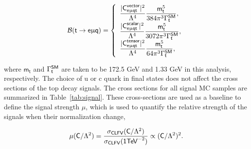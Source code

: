 \begin{equation}
\label{eq:4}
\mathcal{B}(\textsf{t}\rightarrow\textsf{e}\upmu\textsf{q}) = 
\left\{ 
 \begin{array}{l}
 \displaystyle
 \frac{|\textsf{C}^{\textsf{vector}}_{\textsf{e}\upmu\textsf{{q}t}}|^2}{\mathrm{\Lambda}^4}\frac{\textsf{m}_\textsf{t}^5}{384\pi^3\mathrm{\Gamma}_{\textsf{t}}^{\textsf{SM}}},\\
 \displaystyle
 \frac{|\textsf{C}^{\textsf{scalar}}_{\textsf{e}\upmu\textsf{{q}t}}|^2}{\mathrm{\Lambda}^4}\frac{\textsf{m}_\textsf{t}^5}{3072\pi^3\mathrm{\Gamma}_{\textsf{t}}^{\textsf{SM}}}, \\
 \displaystyle
 \frac{|\textsf{C}^{\textsf{tensor}}_{\textsf{e}\upmu\textsf{{q}t}}|^2}{\mathrm{\Lambda}^4}\frac{\textsf{m}_\textsf{t}^5}{64\pi^3\mathrm{\Gamma}_{\textsf{t}}^{\textsf{SM}}}, 
\end{array}
\right.
\end{equation}

where $\textsf{m}_{\textsf{t}}$ and $\mathrm{\Gamma}_{\textsf{t}}^{\textsf{SM}}$ are taken to be 172.5 GeV and 1.33 GeV in this analysis, respectively. The choice of u or c quark in final states does not affect the cross sections of the top decay signals. The cross sections for all signal \ac{MC} samples are summarized in Table~\ref{tab:signal}. These cross-sections are used as a baseline to define the signal strength $\mu$, which is used to quantify the relative strength of the signals when their normalization change,

\begin{equation}
\mu(\textsf{C}/\mathrm{\Lambda}^2)=\frac{\sigma_{\textsf{CLFV}}(\textsf{C}/\mathrm{\Lambda}^2)}{\sigma_{\textsf{CLFV}}(\textsf{1}\textsf{TeV}^{-2})}\propto(\textsf{C}/\mathrm{\Lambda}^2)^2.
\label{eq:signal_strength}
\end{equation}

